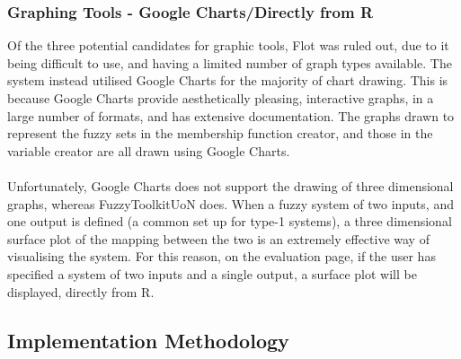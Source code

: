 \tocless\subsubsection{Graphing Tools - Google Charts/Directly from R}
Of the three potential candidates for graphic tools, Flot was ruled out, due to it being difficult to use, and having a limited number of graph types available. The system instead utilised Google Charts for the majority of chart drawing. This is because Google Charts provide aesthetically pleasing, interactive graphs, in a large number of formats, and has extensive documentation. The graphs drawn to represent the fuzzy sets in the membership function creator, and those in the variable creator are all drawn using Google Charts.\ \\
\ \\
Unfortunately, Google Charts does not support the drawing of three dimensional graphs, whereas FuzzyToolkitUoN does. When a fuzzy system of two inputs, and one output is defined (a common set up for type-1 systems), a three dimensional surface plot of the mapping between the two is an extremely effective way of visualising the system. For this reason, on the evaluation page, if the user has specified a system of two inputs and a single output, a surface plot will be displayed, directly from R.

\subsection{Implementation Methodology}

